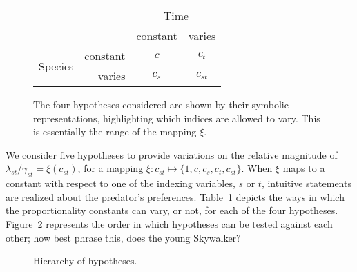 \begin{figure}
  \centering
  \begin{tabular}{rrcc}
    & & \multicolumn{2}{c}{Time} \\
    & & constant & varies \\
    \cline{3-4}
    \multirow{2}{*}{Species} & \multicolumn{1}{r|}{constant} & \multicolumn{1}{c}{$c$} & \multicolumn{1}{|c|}{$c_t$} \\ 
    \cline{3-4}
    & \multicolumn{1}{r|}{varies} & \multicolumn{1}{c}{$c_s$} & \multicolumn{1}{|c|}{$c_{st}$} \\
    \cline{3-4}
  \end{tabular}
  \caption{The four hypotheses considered are shown by their symbolic representations, highlighting which indices are allowed to vary.  This is essentially the range of the mapping $\xi$.  }
  \label{tab:hyp}
\end{figure}

We consider five hypotheses to provide variations on the relative magnitude of $\lambda_{st}/\gamma_{st} = \xi(c_{st})$, for a mapping $\xi: c_{st} \mapsto \{1, c, c_s, c_t, c_{st}\}$.  When $\xi$ maps to a constant with respect to one of the indexing variables, $s$ or $t$, intuitive statements are realized about the predator's preferences.  Table~\ref{tab:hyp} depicts the ways in which the proportionality constants can vary, or not, for each of the four hypotheses. Figure~\ref{fig:hier} represents the order in which hypotheses can be tested against each other; how best phrase this, does the young Skywalker?

\begin{figure}
  \centering
  
  \caption{Hierarchy of hypotheses.}
  \label{fig:hier}
\end{figure}


